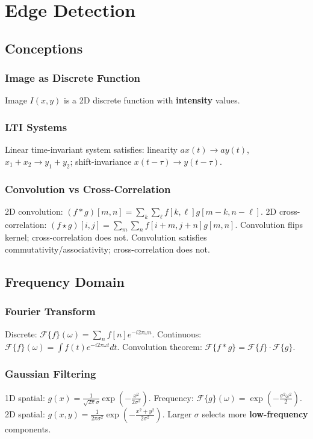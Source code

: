 \section{Edge Detection}
\subsection{Conceptions}
\subsubsection*{Image as Discrete Function}
Image $I(x,y)$ is a 2D discrete function with \textbf{intensity} values.

\subsubsection*{LTI Systems}
Linear time-invariant system satisfies: linearity $a x(t)\to a y(t)$, $x_1+x_2\to y_1+y_2$; shift-invariance $x(t-\tau)\to y(t-\tau)$.

\subsubsection*{Convolution vs Cross-Correlation}
2D convolution: $(f*g)[m,n]=\sum_k\sum_\ell f[k,\ell]g[m-k,n-\ell]$. \newline
2D cross-correlation: $(f\star g)[i,j]=\sum_m\sum_n f[i+m,j+n]g[m,n]$. \newline
Convolution flips kernel; cross-correlation does not. Convolution satisfies commutativity/associativity; cross-correlation does not.

\subsection{Frequency Domain}
\subsubsection*{Fourier Transform}
Discrete: $\mathcal{F}\{f\}(\omega)=\sum_n f[n]e^{-i2\pi\omega n}$. Continuous: $\mathcal{F}\{f\}(\omega)=\int f(t)e^{-i2\pi\omega t}dt$.
Convolution theorem: $\mathcal{F}\{f*g\}=\mathcal{F}\{f\}\cdot\mathcal{F}\{g\}$.

\subsubsection*{Gaussian Filtering}
1D spatial: $g(x)=\frac{1}{\sqrt{2\pi}\sigma}\exp(-\frac{x^2}{2\sigma^2})$. Frequency: $\mathcal{F}\{g\}(\omega)=\exp(-\frac{\sigma^2\omega^2}{2})$.
2D spatial: $g(x,y)=\frac{1}{2\pi\sigma^2}\exp(-\frac{x^2+y^2}{2\sigma^2})$. Larger $\sigma$ selects more \textbf{low-frequency} components.

